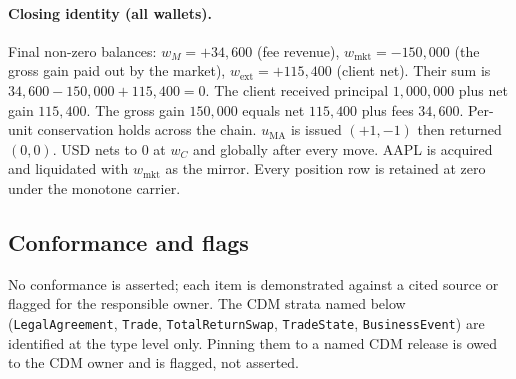 \paragraph{Closing identity (all wallets).} Final non-zero balances: $w_M=+34{,}600$ (fee
revenue), $w_{\text{mkt}}=-150{,}000$ (the gross gain paid out by the market),
$w_{\text{ext}}=+115{,}400$ (client net). Their sum is
$34{,}600-150{,}000+115{,}400=0$. The client received principal $1{,}000{,}000$ plus net
gain $115{,}400$. The gross gain $150{,}000$ equals net $115{,}400$ plus fees $34{,}600$.
Per-unit conservation holds across the chain. $u_{\mathrm{MA}}$ is issued $(+1,-1)$ then
returned $(0,0)$. USD nets to $0$ at $w_C$ and globally after every move. AAPL is acquired
and liquidated with $w_{\text{mkt}}$ as the mirror. Every position row is retained at zero
under the monotone carrier.

\subsection{Conformance and flags}
\label{sec:managed-conformance}

No conformance is asserted; each item is demonstrated against a cited source or flagged for
the responsible owner. The CDM strata named below (\texttt{LegalAgreement}, \texttt{Trade},
\texttt{TotalReturnSwap}, \texttt{TradeState}, \texttt{BusinessEvent}) are identified at the
type level only. Pinning them to a named CDM release is owed to the CDM owner and is
flagged, not asserted.

